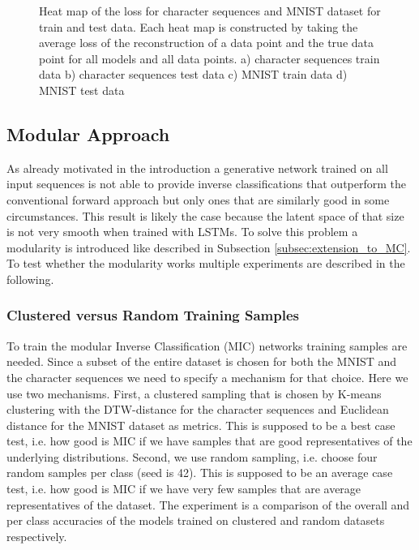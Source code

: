 \documentclass{article}
\begin{document}
\begin{figure}[!htb]
\begin{tabular}{cc}
	\end{tabular}
	\caption{Heat map of the loss for character sequences and MNIST dataset for train and test data. Each heat map is constructed by taking the average loss of the reconstruction of a data point and the true data point for all models and all data points. a) character sequences train data b) character sequences test data c) MNIST train data d) MNIST test data}
	\label{fig:heatmaps}	
\end{figure}	

\subsection{Modular Approach}
\label{subsec:modular}

As already motivated in the introduction a generative network trained on all input sequences is not able to provide inverse classifications that outperform the conventional forward approach but only ones that are similarly good in some circumstances. This result is likely the case because the latent space of that size is not very smooth when trained with LSTMs. To solve this problem a modularity is introduced like described in Subsection \ref{subsec:extension_to_MC}. To test whether the modularity works multiple experiments are described in the following.

\subsubsection{Clustered versus Random Training Samples}

To train the modular Inverse Classification (MIC) networks training samples are needed. Since a subset of the entire dataset is chosen for both the MNIST and the character sequences we need to specify a mechanism for that choice. Here we use two mechanisms. First, a clustered sampling that is chosen by K-means clustering with the DTW-distance for the character sequences and Euclidean distance for the MNIST dataset as metrics. This is supposed to be a best case test, i.e. how good is MIC if we have samples that are good representatives of the underlying distributions. Second, we use random sampling, i.e. choose four random samples per class (seed is 42). This is supposed to be an average case test, i.e. how good is MIC if we have very few samples that are average representatives of the dataset. The experiment is a comparison of the overall and per class accuracies of the models trained on clustered and random datasets respectively. 
\end{document}
